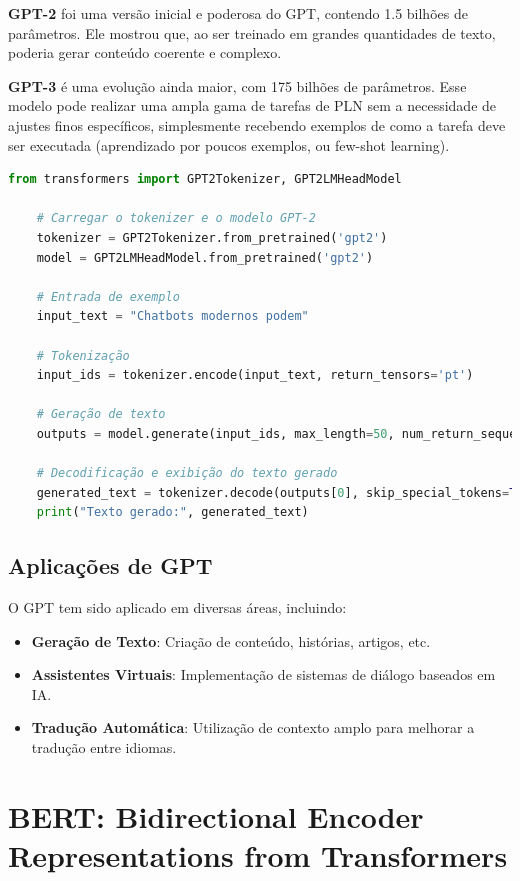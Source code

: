 \documentclass[14pt,a4paper,oneside]{book}
\begin{document}
\textbf{GPT-2} foi uma versão inicial e poderosa do GPT, contendo 1.5 bilhões de parâmetros. Ele mostrou que, ao ser treinado em grandes quantidades de texto, poderia gerar conteúdo coerente e complexo.

\textbf{GPT-3} é uma evolução ainda maior, com 175 bilhões de parâmetros. Esse modelo pode realizar uma ampla gama de tarefas de PLN sem a necessidade de ajustes finos específicos, simplesmente recebendo exemplos de como a tarefa deve ser executada (aprendizado por poucos exemplos, ou few-shot learning).

\begin{lstlisting}[language=Python]
	from transformers import GPT2Tokenizer, GPT2LMHeadModel
	
	# Carregar o tokenizer e o modelo GPT-2
	tokenizer = GPT2Tokenizer.from_pretrained('gpt2')
	model = GPT2LMHeadModel.from_pretrained('gpt2')
	
	# Entrada de exemplo
	input_text = "Chatbots modernos podem"
	
	# Tokenização
	input_ids = tokenizer.encode(input_text, return_tensors='pt')
	
	# Geração de texto
	outputs = model.generate(input_ids, max_length=50, num_return_sequences=1)
	
	# Decodificação e exibição do texto gerado
	generated_text = tokenizer.decode(outputs[0], skip_special_tokens=True)
	print("Texto gerado:", generated_text)
\end{lstlisting}

\subsection{Aplicações de GPT}

O GPT tem sido aplicado em diversas áreas, incluindo:

\begin{itemize}
	\item \textbf{Geração de Texto}: Criação de conteúdo, histórias, artigos, etc.
	\item \textbf{Assistentes Virtuais}: Implementação de sistemas de diálogo baseados em IA.
	\item \textbf{Tradução Automática}: Utilização de contexto amplo para melhorar a tradução entre idiomas.
\end{itemize}

\section{BERT: Bidirectional Encoder Representations from Transformers}
\end{document}

